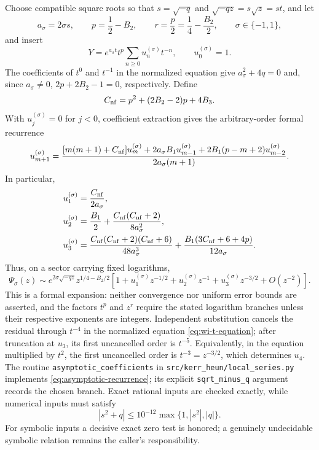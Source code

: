 \documentclass[11pt]{article}
\theoremstyle{remark}
\begin{document}
Choose compatible square roots so that \(s=\sqrt{-q}\) and
\(\sqrt{-qz}=s\sqrt z=st\), and let
\begin{equation}
 a_\sigma=2\sigma s,\qquad
 p=\frac12-B_2,\qquad
 r=\frac p2=\frac14-\frac{B_2}{2},
 \qquad \sigma\in\{-1,1\},
 \label{eq:asymptotic-parameters}
\end{equation}
and insert
\[
 Y=e^{a_\sigma t}t^p\sum_{n\ge0}u_n^{(\sigma)}t^{-n},
 \qquad u_0^{(\sigma)}=1.
\]
The coefficients of \(t^0\) and \(t^{-1}\) in the normalized
equation give \(a_\sigma^2+4q=0\) and, since \(a_\sigma\ne0\),
\(2p+2B_2-1=0\), respectively.
Define
\begin{equation}
 C_{\rm nf}=p^2+(2B_2-2)p+4B_3.
 \label{eq:asymptotic-C}
\end{equation}
With \(u_j^{(\sigma)}=0\) for \(j<0\), coefficient extraction gives the
arbitrary-order formal recurrence
\begin{equation}
 u_{m+1}^{(\sigma)}
 =\frac{[m(m+1)+C_{\rm nf}]u_m^{(\sigma)}
 +2a_\sigma B_1u_{m-1}^{(\sigma)}
 +2B_1(p-m+2)u_{m-2}^{(\sigma)}}
 {2a_\sigma(m+1)}.
 \label{eq:asymptotic-recurrence}
\end{equation}
In particular,
\begin{align}
 u_1^{(\sigma)}={}&\frac{C_{\rm nf}}{2a_\sigma},\nonumber\\
 u_2^{(\sigma)}={}&\frac{B_1}{2}
 +\frac{C_{\rm nf}(C_{\rm nf}+2)}{8a_\sigma^2},\nonumber\\
 u_3^{(\sigma)}={}&
 \frac{C_{\rm nf}(C_{\rm nf}+2)(C_{\rm nf}+6)}{48a_\sigma^3}
 +\frac{B_1(3C_{\rm nf}+6+4p)}{12a_\sigma}.
 \label{eq:asymptotic-first-three}
\end{align}
Thus, on a sector carrying fixed logarithms,
\begin{equation}
 \Psi_\sigma(z)\sim
 e^{2\sigma\sqrt{-qz}}z^{1/4-B_2/2}
 \left[1+u_1^{(\sigma)}z^{-1/2}
 +u_2^{(\sigma)}z^{-1}
 +u_3^{(\sigma)}z^{-3/2}+O(z^{-2})\right].
 \label{eq:asymptotic-three-terms}
\end{equation}
This is a formal expansion: neither convergence nor uniform error bounds are
asserted, and the factors \(t^p\) and \(z^r\) require the stated logarithm
branches unless their respective exponents are integers.  Independent
substitution cancels the residual through \(t^{-4}\) in the normalized
equation \eqref{eq:wi-t-equation}; after truncation at \(u_3\), its first
uncancelled order is \(t^{-5}\).  Equivalently, in the equation multiplied
by \(t^2\), the first uncancelled order is \(t^{-3}=z^{-3/2}\), which
determines \(u_4\).
The routine \texttt{asymptotic\_coefficients} in
\texttt{src/kerr\_heun/local\_series.py} implements
\eqref{eq:asymptotic-recurrence}; its explicit
\texttt{sqrt\_minus\_q} argument records the chosen branch.  Exact rational
inputs are checked exactly, while numerical inputs must satisfy
\[
 |s^2+q|\leq 10^{-12}\max\{1,|s^2|,|q|\}.
\]
For symbolic inputs a decisive exact zero test is honored; a genuinely
undecidable symbolic relation remains the caller's responsibility.
\end{document}
